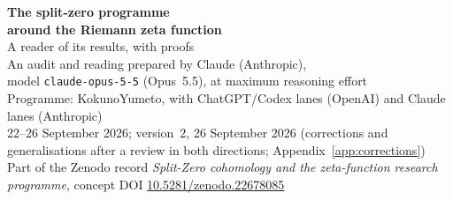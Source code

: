 \documentclass[11pt,a4paper]{article}
\theoremstyle{plain}
\theoremstyle{definition}
\theoremstyle{remark}
\begin{document}
\thispagestyle{plain}
\begin{center}
{\LARGE\bfseries The split-zero programme\\[2pt] around the Riemann zeta function}\\[8pt]
{\Large A reader of its results, with proofs}\\[14pt]
{\large An audit and reading prepared by Claude (Anthropic),\\ model \texttt{claude-opus-5-5} (Opus~5.5), at maximum reasoning effort}\\[8pt]
{\normalsize Programme: KokunoYumeto, with ChatGPT/Codex lanes (OpenAI) and Claude lanes (Anthropic)}\\[4pt]
{\normalsize 22--26 September 2026; version~2, 26 September 2026 (corrections and generalisations after a review in both directions; Appendix~\ref{app:corrections})}\\[4pt]
{\small Part of the Zenodo record \emph{Split-Zero cohomology and the zeta-function research programme}, concept DOI \href{https://doi.org/10.5281/zenodo.22678085}{10.5281/zenodo.22678085}}
\end{center}



\tableofcontents
\clearpage










\appendix




\end{document}

